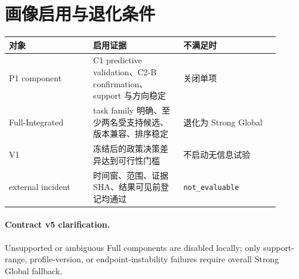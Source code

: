 \section{画像启用与退化条件}

\begin{longtable}{p{0.28\linewidth}p{0.30\linewidth}p{0.32\linewidth}}
\toprule
对象 & 启用证据 & 不满足时 \\
\midrule
\endhead
P1 component & C1 predictive validation、C2-B confirmation、support 与方向稳定 & 关闭单项 \\
Full-Integrated & task family 明确、至少两名受支持候选、版本兼容、排序稳定 & 退化为 Strong Global \\
V1 & 冻结后的政策决策差异达到可行性门槛 & 不启动无信息试验 \\
external incident & 时间窗、范围、证据 SHA、结果可见前登记均通过 & \texttt{not\_evaluable} \\
\bottomrule
\end{longtable}

\paragraph{Contract v5 clarification.} Unsupported or ambiguous Full components are disabled locally; only support-range, profile-version, or endpoint-instability failures require overall Strong Global fallback.
